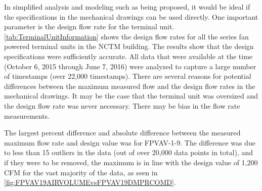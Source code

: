 In simplified analysis and modeling such as being proposed, it would be ideal if the specifications in the mechanical drawings can be used directly.
One important parameter is the design flow rate for the terminal unit.
\tableref \ref{tab:TerminalUnitInformation} shows the design flow rates for all the series fan powered terminal units in the NCTM building.
The results show that the design specifications were sufficiently accurate.
All data that were available at the time (October 6, 2015 through June 7, 2016) were analyzed to capture a large number of timestamps (over 22,000 timestamps).
There are several reasons for potential differences between the maximum measured flow and the design flow rates in the mechanical drawings.
It may be the case that the terminal unit was oversized and the design flow rate was never necessary. There may be bias in the flow rate measurements.  

The largest percent difference and absolute difference between the measured maximum flow rate and design value was for FPVAV-1-9. The difference was due to less than 15 outliers in the data (out of over 20,000 data points in total), and if they were to be removed, the maximum is in line with the design value of 1,200 CFM for the vast majority of the data, as seen in \figref{} \ref{fig:FPVAV19AIRVOLUMEvsFPVAV19DMPRCOMD}. 

